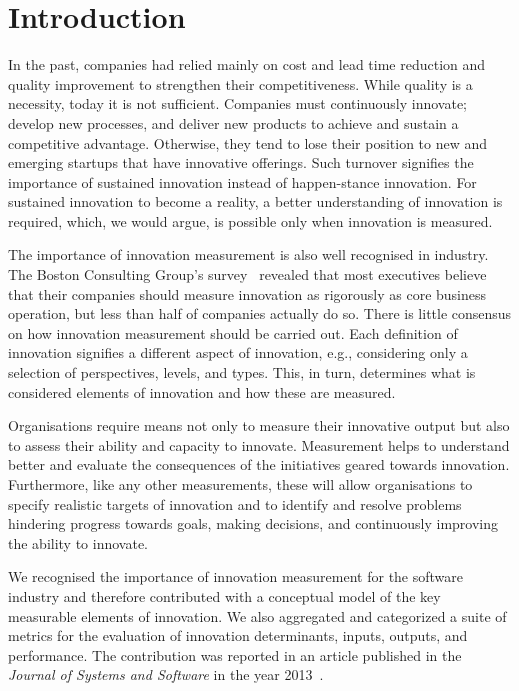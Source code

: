\documentclass[sigconf,review]{acmart}
\begin{document}
\section{Introduction}\label{sec:intro}
In the past, companies had relied mainly on cost and lead time reduction and quality improvement to strengthen their competitiveness. While quality is a necessity, today it is not sufficient. Companies must continuously innovate; develop new processes, and deliver new products to achieve and sustain a competitive advantage. Otherwise, they tend to lose their position to new and emerging startups that have innovative offerings. Such turnover signifies the importance of sustained innovation instead of happen-stance innovation. For sustained innovation to become a reality, a better understanding of innovation is required, which, we would argue, is possible only when innovation is measured.

The importance of innovation measurement is also well recognised in industry. The Boston Consulting Group's survey~\cite{andrew08} revealed that most executives believe that their companies should measure innovation as rigorously as core business operation, but less than half of companies actually do so. There is little consensus on how innovation measurement should be carried out. Each definition of innovation signifies a different aspect of innovation, e.g., considering only a selection of perspectives, levels, and types. This, in turn, determines what is considered elements of innovation and how these are measured.

Organisations require means not only to measure their innovative output but also to assess their ability and capacity to innovate. Measurement helps to understand better and evaluate the consequences of the initiatives geared towards innovation. Furthermore, like any other measurements, these will allow organisations to specify realistic targets of innovation and to identify and resolve problems hindering progress towards goals, making decisions, and continuously improving the ability to innovate.

We recognised the importance of innovation measurement for the software industry and therefore contributed with a conceptual model of the key measurable elements of innovation. We also aggregated and categorized a suite of metrics for the evaluation of innovation determinants, inputs, outputs, and performance. The contribution was reported in an article published in the \textit{Journal of Systems and Software} in the year 2013~\cite{EdisonAT13}.
\end{document}
